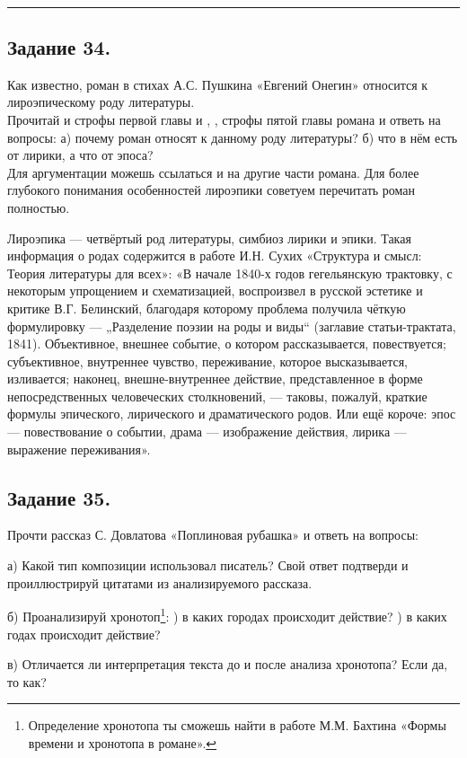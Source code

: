 \\
\rule[0.5\baselineskip]{\textwidth}{1pt}
\vspace{-1.5\baselineskip}


\subsection*{Задание 34.}

    Как известно, роман в стихах А.С. Пушкина «Евгений Онегин» относится к лироэпическому роду литературы. \\
    Прочитай  и  строфы первой главы и , ,  строфы пятой главы романа и ответь на вопросы: а) почему роман относят к данному роду литературы? б) что в нём есть от лирики, а что от эпоса? \\
    Для аргументации можешь ссылаться и на другие части романа. Для более глубокого понимания особенностей лироэпики советуем перечитать роман полностью.
    
    Лироэпика — четвёртый род литературы, симбиоз лирики и эпики. Такая информация о родах содержится в работе И.Н. Сухих «Структура и смысл: Теория литературы для всех»: «В начале 1840-х годов гегельянскую трактовку, с некоторым упрощением и схематизацией, воспроизвел в русской эстетике и критике В.Г. Белинский, благодаря которому проблема получила чёткую формулировку — „Разделение поэзии на роды и виды“ (заглавие статьи-трактата, 1841). Объективное, внешнее событие, о котором рассказывается, повествуется; субъективное, внутреннее чувство, переживание, которое высказывается, изливается; наконец, внешне-внутреннее действие, представленное в форме непосредственных человеческих столкновений, — таковы, пожалуй, краткие формулы эпического, лирического и драматического родов. Или ещё короче: эпос — повествование о событии, драма — изображение действия, лирика — выражение переживания».

\subsection*{Задание 35.}
    Прочти рассказ С. Довлатова «Поплиновая рубашка» и ответь на вопросы:
    \begin{compactenum}
        \setlength\itemsep{-0.25em}
        \item[а)] Какой тип композиции использовал писатель? Свой ответ подтверди и проиллюстрируй цитатами из анализируемого рассказа.
        \item[б)] Проанализируй хронотоп\footnote{ Определение хронотопа ты сможешь найти в работе М.М. Бахтина «Формы времени и хронотопа в романе».}: ) в каких городах происходит действие? ) в каких годах происходит действие?
        \item[в)] Отличается ли интерпретация текста до и после анализа хронотопа? Если да, то как?
    \end{compactenum}
    
